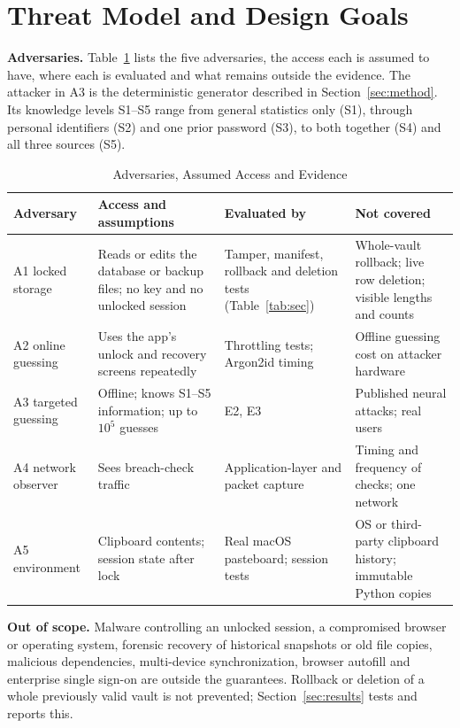 \documentclass[conference]{IEEEtran}
\begin{document}
\section{Threat Model and Design Goals}
\label{sec:threat}
\textbf{Adversaries.} Table~\ref{tab:threats} lists the five adversaries, the access each is assumed to have, where each is evaluated and what remains outside the evidence. The attacker in A3 is the deterministic generator described in Section~\ref{sec:method}. Its knowledge levels S1--S5 range from general statistics only (S1), through personal identifiers (S2) and one prior password (S3), to both together (S4) and all three sources (S5).

\begin{table}[t]
\caption{Adversaries, Assumed Access and Evidence}
\label{tab:threats}
\centering\scriptsize
\begin{tabular}{@{}p{1.0cm}p{2.3cm}p{1.9cm}p{2.2cm}@{}}
\toprule
Adversary & Access and assumptions & Evaluated by & Not covered\\
\midrule
A1 locked storage & Reads or edits the database or backup files; no key and no unlocked session & Tamper, manifest, rollback and deletion tests (Table~\ref{tab:sec}) & Whole-vault rollback; live row deletion; visible lengths and counts\\
A2 online guessing & Uses the app's unlock and recovery screens repeatedly & Throttling tests; Argon2id timing & Offline guessing cost on attacker hardware\\
A3 targeted guessing & Offline; knows S1--S5 information; up to $10^5$ guesses & E2, E3 & Published neural attacks; real users\\
A4 network observer & Sees breach-check traffic & Application-layer and packet capture & Timing and frequency of checks; one network\\
A5 environment & Clipboard contents; session state after lock & Real macOS pasteboard; session tests & OS or third-party clipboard history; immutable Python copies\\
\bottomrule
\end{tabular}
\end{table}

\textbf{Out of scope.} Malware controlling an unlocked session, a compromised browser or operating system, forensic recovery of historical snapshots or old file copies, malicious dependencies, multi-device synchronization, browser autofill and enterprise single sign-on are outside the guarantees. Rollback or deletion of a whole previously valid vault is not prevented; Section~\ref{sec:results} tests and reports this.
\end{document}

